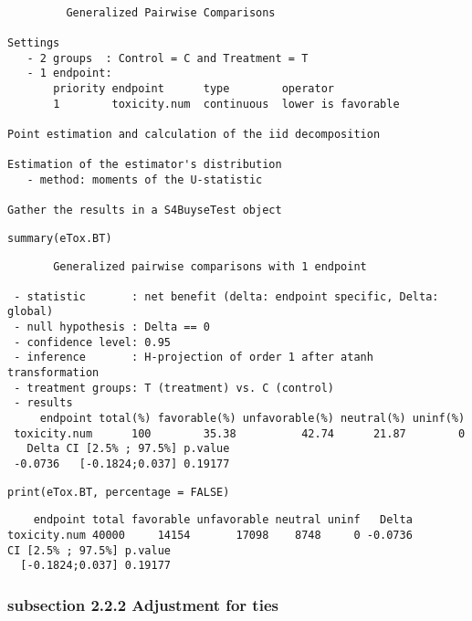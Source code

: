 \documentclass[12pt]{article}
\begin{document}
\begin{verbatim}

         Generalized Pairwise Comparisons

Settings 
   - 2 groups  : Control = C and Treatment = T
   - 1 endpoint: 
       priority endpoint      type        operator           
       1        toxicity.num  continuous  lower is favorable 

Point estimation and calculation of the iid decomposition

Estimation of the estimator's distribution 
   - method: moments of the U-statistic

Gather the results in a S4BuyseTest object
\end{verbatim}

\lstset{language=r,label= ,caption= ,captionpos=b,numbers=none}
\begin{lstlisting}
summary(eTox.BT)
\end{lstlisting}

\begin{verbatim}
       Generalized pairwise comparisons with 1 endpoint

 - statistic       : net benefit (delta: endpoint specific, Delta: global) 
 - null hypothesis : Delta == 0 
 - confidence level: 0.95 
 - inference       : H-projection of order 1 after atanh transformation 
 - treatment groups: T (treatment) vs. C (control) 
 - results
     endpoint total(%) favorable(%) unfavorable(%) neutral(%) uninf(%)
 toxicity.num      100        35.38          42.74      21.87        0
   Delta CI [2.5% ; 97.5%] p.value 
 -0.0736   [-0.1824;0.037] 0.19177
\end{verbatim}

\lstset{language=r,label= ,caption= ,captionpos=b,numbers=none}
\begin{lstlisting}
print(eTox.BT, percentage = FALSE)
\end{lstlisting}

\begin{verbatim}
    endpoint total favorable unfavorable neutral uninf   Delta
toxicity.num 40000     14154       17098    8748     0 -0.0736
CI [2.5% ; 97.5%] p.value
  [-0.1824;0.037] 0.19177
\end{verbatim}


\subsubsection{subsection 2.2.2 Adjustment for ties}
\label{sec:org444a356}
\end{document}
